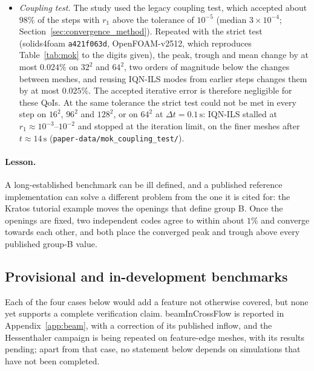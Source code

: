\begin{itemize}
	\item \emph{Coupling test.} The study used the legacy coupling test, which accepted about $98\%$ of the steps with $r_1$ above the tolerance of $10^{-5}$ (median $3\times10^{-4}$; Section~\ref{sec:convergence_method}). Repeated with the strict test (solids4foam \texttt{a421f063d}, OpenFOAM-v2512, which reproduces Table~\ref{tab:mok} to the digits given), the peak, trough and mean change by at most $0.024\%$ on $32^2$ and $64^2$, two orders of magnitude below the changes between meshes, and reusing IQN-ILS modes from earlier steps changes them by at most $0.025\%$. The accepted iterative error is therefore negligible for these QoIs. At the same tolerance the strict test could not be met in every step on $16^2$, $96^2$ and $128^2$, or on $64^2$ at $\Delta t = 0.1\,\mathrm{s}$: IQN-ILS stalled at $r_1 \approx 10^{-3}$--$10^{-2}$ and stopped at the iteration limit, on the finer meshes after $t \approx 14\,\mathrm{s}$ (\texttt{paper-data/mok\_coupling\_test/}).
\end{itemize}

\paragraph{Lesson.}
A long-established benchmark can be ill defined, and a published reference implementation can solve a different problem from the one it is cited for: the Kratos tutorial example moves the openings that define group B.
Once the openings are fixed, two independent codes agree to within about $1\%$ and converge towards each other, and both place the converged peak and trough above every published group-B value.


\subsection{Provisional and in-development benchmarks}\label{sec:provisional}

Each of the four cases below would add a feature not otherwise covered, but none yet supports a complete verification claim. beamInCrossFlow is reported in Appendix~\ref{app:beam}, with a correction of its published inflow, and the Hessenthaler campaign is being repeated on feature-edge meshes, with its results pending; apart from that case, no statement below depends on simulations that have not been completed.

